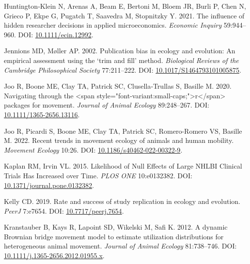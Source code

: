 \documentclass[10pt,a4paper]{article}
\newlength{\cslhangindent}
\newlength{\cslentryspacingunit} %
\newenvironment{CSLReferences}[2] %
 {%
  \setlength{\parindent}{0pt}
  \ifodd #1
  \let\oldpar\par
  \def\par{\hangindent=\cslhangindent\oldpar}
  \fi
  \setlength{\parskip}{#2\cslentryspacingunit}
 }%
 {}
\begin{document}
\begin{CSLReferences}{1}{0}
\leavevmode{}%
Huntington‐Klein N, Arenas A, Beam E, Bertoni M, Bloem JR, Burli P, Chen N, Grieco P, Ekpe G, Pugatch T, Saavedra M, Stopnitzky Y. 2021. The influence of hidden researcher decisions in applied microeconomics. \emph{Economic Inquiry} 59:944--960. DOI: \href{https://doi.org/10.1111/ecin.12992}{10.1111/ecin.12992}.

\leavevmode{}%
Jennions MD, Møller AP. 2002. Publication bias in ecology and evolution: An empirical assessment using the `trim and fill' method. \emph{Biological Reviews of the Cambridge Philosophical Society} 77:211--222. DOI: \href{https://doi.org/10.1017/S1464793101005875}{10.1017/S1464793101005875}.

\leavevmode{}%
Joo R, Boone ME, Clay TA, Patrick SC, Clusella‐Trullas S, Basille M. 2020. Navigating through the {\textless{}}span style="font-variant:small-caps;"{\textgreater{}}r{\textless{}}/span{\textgreater{}} packages for movement. \emph{Journal of Animal Ecology} 89:248--267. DOI: \href{https://doi.org/10.1111/1365-2656.13116}{10.1111/1365-2656.13116}.

\leavevmode{}%
Joo R, Picardi S, Boone ME, Clay TA, Patrick SC, Romero-Romero VS, Basille M. 2022. Recent trends in movement ecology of animals and human mobility. \emph{Movement Ecology} 10:26. DOI: \href{https://doi.org/10.1186/s40462-022-00322-9}{10.1186/s40462-022-00322-9}.

\leavevmode{}%
Kaplan RM, Irvin VL. 2015. Likelihood of {Null} {Effects} of {Large} {NHLBI} {Clinical} {Trials} {Has} {Increased} over {Time}. \emph{PLOS ONE} 10:e0132382. DOI: \href{https://doi.org/10.1371/journal.pone.0132382}{10.1371/journal.pone.0132382}.

\leavevmode{}%
Kelly CD. 2019. Rate and success of study replication in ecology and evolution. \emph{PeerJ} 7:e7654. DOI: \href{https://doi.org/10.7717/peerj.7654}{10.7717/peerj.7654}.

\leavevmode{}%
Kranstauber B, Kays R, Lapoint SD, Wikelski M, Safi K. 2012. A dynamic {Brownian} bridge movement model to estimate utilization distributions for heterogeneous animal movement. \emph{Journal of Animal Ecology} 81:738--746. DOI: \href{https://doi.org/10.1111/j.1365-2656.2012.01955.x}{10.1111/j.1365-2656.2012.01955.x}.


\end{CSLReferences}
\end{document}

